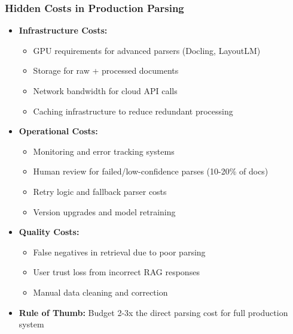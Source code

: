 \begin{frame}[fragile]\frametitle{Hidden Costs in Production Parsing}
      \begin{itemize}
        \item \textbf{Infrastructure Costs:}
        \begin{itemize}
            \item GPU requirements for advanced parsers (Docling, LayoutLM)
            \item Storage for raw + processed documents
            \item Network bandwidth for cloud API calls
            \item Caching infrastructure to reduce redundant processing
        \end{itemize}
        \item \textbf{Operational Costs:}
        \begin{itemize}
            \item Monitoring and error tracking systems
            \item Human review for failed/low-confidence parses (10-20\% of docs)
            \item Retry logic and fallback parser costs
            \item Version upgrades and model retraining
        \end{itemize}
        \item \textbf{Quality Costs:}
        \begin{itemize}
            \item False negatives in retrieval due to poor parsing
            \item User trust loss from incorrect RAG responses
            \item Manual data cleaning and correction
        \end{itemize}
        \item \textbf{Rule of Thumb:} Budget 2-3x the direct parsing cost for full production system
      \end{itemize}
\end{frame}

